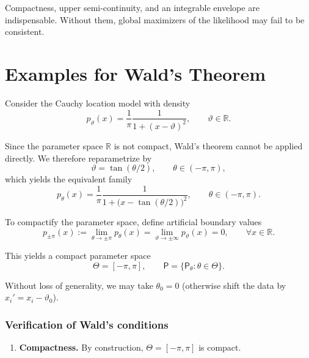\begin{note}
Compactness, upper semi-continuity, and an integrable envelope are indispensable. Without them, global maximizers of the likelihood may fail to be consistent.
\end{note}

\section{Examples for Wald's Theorem}

\begin{ex}
\label{ex:cauchy}

Consider the Cauchy location model with density
\begin{equation*}
p_{\vartheta}(x)
=
\frac{1}{\pi}\frac{1}{1+(x-\vartheta)^2},
\qquad \vartheta\in\mathbb{R}.
\end{equation*}

Since the parameter space $\mathbb{R}$ is not compact, Wald's theorem cannot be applied directly. We therefore reparametrize by
\begin{equation*}
\vartheta = \tan(\theta/2),
\qquad \theta\in(-\pi,\pi),
\end{equation*}
which yields the equivalent family
\begin{equation*}
p_{\theta}(x)
=
\frac{1}{\pi}\frac{1}{1+\bigl(x-\tan(\theta/2)\bigr)^2},
\qquad \theta\in(-\pi,\pi).
\end{equation*}

To compactify the parameter space, define artificial boundary values
\begin{equation*}
p_{\pm\pi}(x)
:=
\lim_{\theta\to\pm\pi} p_\theta(x)
=
\lim_{\vartheta\to\pm\infty} p_\vartheta(x)
=
0,
\qquad \forall x\in\mathbb{R}.
\end{equation*}

This yields a compact parameter space
\begin{equation*}
\Theta = [-\pi,\pi],
\qquad
\mathsf{P} = \{\mathsf{P}_\theta:\theta\in\Theta\}.
\end{equation*}

Without loss of generality, we may take $\theta_0=0$ (otherwise shift the data by $x_i' = x_i-\vartheta_0$).

\subsubsection*{Verification of Wald's conditions}

\begin{enumerate}[label=\alph*)]
\item \textbf{Compactness.}
By construction, $\Theta=[-\pi,\pi]$ is compact.


\end{enumerate}
\end{ex}
